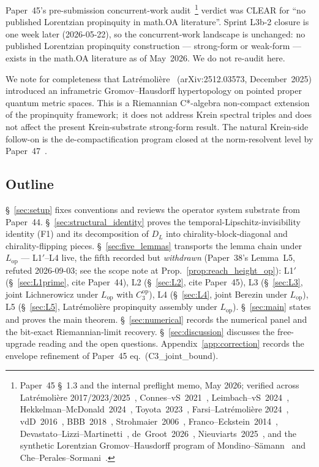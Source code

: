 \documentclass[11pt,a4paper]{article}
\theoremstyle{plain}
\theoremstyle{definition}
\newcommand{\DL}{D_{L}}
\newcommand{\Lop}{L_{\mathrm{op}}}
\newcommand{\Cthreeop}{C_{3}^{\mathrm{op}}}
\begin{document}
Paper~45's pre-submission concurrent-work
audit~\footnote{Paper~45 \S~1.3 and the internal preflight memo, May
2026; verified across Latr\'emoli\`ere
2017/2023/2025~\cite{latremoliere_metric_st_2017,latremoliere2018,farsi_latremoliere2025},
Connes--vS~2021~\cite{connes_vs2021}, Leimbach--vS~2024~\cite{leimbach_vs2024},
Hekkelman--McDonald~2024~\cite{hekkelman_mcdonald2024b},
Toyota~2023~\cite{toyota2023}, Farsi--Latr\'emoli\`ere
2024~\cite{farsi_latremoliere2024}, vdD~2016~\cite{vandungen2016},
BBB~2018~\cite{bizi_brouder_besnard2018}, Strohmaier~2006~\cite{strohmaier2006},
Franco--Eckstein~2014~\cite{franco_eckstein2014},
Devastato--Lizzi--Martinetti~\cite{devastato_lizzi_martinetti2018},
de~Groot~2026~\cite{de_groot2026_su11},
Nieuviarts~2025~\cite{nieuviarts2025a,nieuviarts2025b_proceedings}, and
the synthetic Lorentzian Gromov--Hausdorff program of
Mondino--S\"amann~\cite{minguzzi_suhr2024,mondino_samann2025} and
Che--Perales--Sormani~\cite{che_perales_sormani2025}.}
verdict was CLEAR for ``no published Lorentzian propinquity in math.OA
literature''. Sprint L3b-2 closure is one week later (2026-05-22), so
the concurrent-work landscape is unchanged: no published Lorentzian
propinquity construction --- strong-form or weak-form --- exists in the
math.OA literature as of May~2026. We do not re-audit here.

We note for completeness that
Latr\'emoli\`ere~\cite{latremoliere2025_hypertopology}
(arXiv:2512.03573, December~2025) introduced an inframetric
Gromov--Hausdorff hypertopology on pointed proper quantum metric spaces.
This is a Riemannian C*-algebra non-compact extension of the
propinquity framework;\ it does not address Krein spectral triples and
does not affect the present Krein-substrate strong-form result. The
natural Krein-side follow-on is the de-compactification program closed
at the norm-resolvent level by Paper~47~\cite{paper47}.

\subsection{Outline}\label{sec:outline}

\S~\ref{sec:setup} fixes conventions and reviews the operator system
substrate from Paper~44. \S~\ref{sec:structural_identity} proves the
temporal-Lipschitz-invisibility identity (F1) and its decomposition of
$\DL$ into chirality-block-diagonal and chirality-flipping pieces.
\S~\ref{sec:five_lemmas} transports the lemma chain under $\Lop$ --- L1$'$--L4
live, the fifth recorded but \emph{withdrawn} (Paper~38's Lemma~L5, refuted
2026-09-03; see the scope note at
Prop.~\ref{prop:reach_height_op}): L1$'$
(\S~\ref{sec:L1prime}, cite Paper~44), L2 (\S~\ref{sec:L2}, cite
Paper~45), L3 (\S~\ref{sec:L3}, joint Lichnerowicz under $\Lop$ with
$\Cthreeop$), L4 (\S~\ref{sec:L4}, joint Berezin under $\Lop$), L5
(\S~\ref{sec:L5}, Latr\'emoli\`ere propinquity assembly under $\Lop$).
\S~\ref{sec:main} states and proves the main theorem.
\S~\ref{sec:numerical} records the numerical panel and the bit-exact
Riemannian-limit recovery. \S~\ref{sec:discussion} discusses the
free-upgrade reading and the open questions. Appendix~\ref{app:correction}
records the envelope refinement of Paper~45 eq.~(C3\_joint\_bound).
\end{document}
